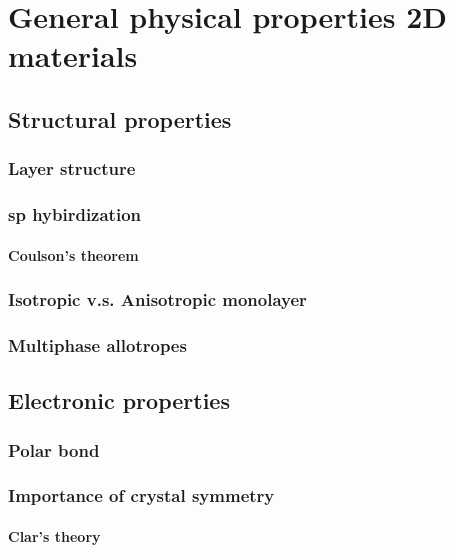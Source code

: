 
\chapter{General physical properties 2D materials}

\ifpdf
    \graphicspath{{Chapter3/Figs/Raster/}{Chapter3/Figs/PDF/}{Chapter3/Figs/}}
\else
    \graphicspath{{Chapter3/Figs/Vector/}{Chapter3/Figs/}}
\fi

\section{Structural properties}
\subsection{Layer structure}
\subsection{sp hybirdization}
\subsubsection{Coulson’s theorem}
\subsection{Isotropic v.s. Anisotropic monolayer}
\subsection{Multiphase allotropes}

\section{Electronic properties}
\subsection{Polar bond}
\subsection{Importance of crystal symmetry}
\subsubsection{Clar’s theory}
